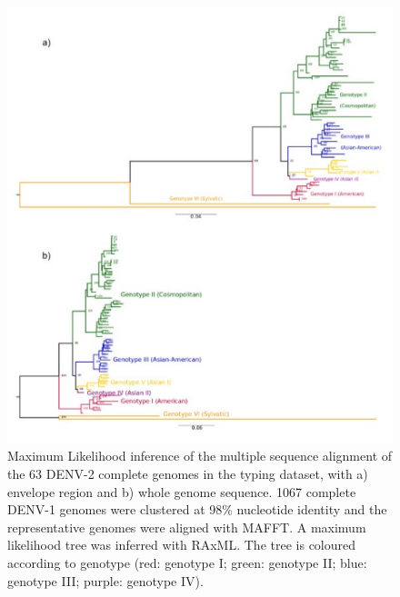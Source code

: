 \begin{figure}[h!]
\centering
\includegraphics[width=\textwidth]{figures/chapter 4/Figure S6.pdf}
\caption{Maximum Likelihood inference of the multiple sequence alignment of the 63 DENV-2 complete genomes in the typing dataset, with a) envelope region and b) whole genome sequence. 1067 complete DENV-1 genomes were clustered at 98\% nucleotide identity and the representative genomes were aligned with MAFFT. A maximum likelihood tree was inferred with RAxML. The tree is coloured according to genotype (red: genotype I; green: genotype II; blue: genotype III; purple: genotype IV).}
\label{fig:chap4_figure_sup6}
\end{figure}

